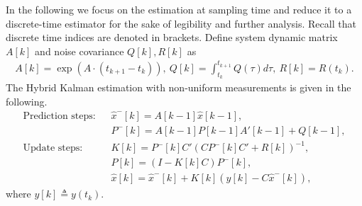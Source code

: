 \documentclass[12pt]{article}
\newcommand{\Rb}{{\mathbb{R}}}
\newcommand{\diag}{{\mathrm{diag}}}
\begin{document}
In the following we focus on the estimation at sampling time and reduce it to a discrete-time estimator for the sake of legibility and further analysis. Recall that discrete time indices are denoted in brackets.
Define system dynamic matrix $A[k]$ and noise covariance $Q[k],R[k]$ as  %
\begin{align*}
A[k]=\exp(A \cdot(t_{k+1}-t_{k}) ), \
Q[k]=\int_{t_k}^{t_{k+1}} Q(\tau)d\tau ,\
R[k]=R(t_k) .
\end{align*}
The Hybrid Kalman estimation with non-uniform measurements is given in the following. 
\begin{subequations}\label{eq:asy_kalman}
	\begin{align}
	\text{Prediction steps: } \hspace{5pt}
	&\hat{x}^-[k]=A[k-1]\hat{x}[k-1] ,\\
	&P^-[k]=A[k-1]P[k-1]A{'}[k-1] + Q[k-1], \\
	\text{Update steps: } \hspace{5pt}
	&K[k]=P^-[k] C{'} \left(C P^-[k] C{'}+R[k] \right)^{-1}  , \label{eq:def_Kk_asy} 	\\
	& P[k] = (I-K[k]C) P^-[k], \label{eq:def_Pt_asy} \\
	& \hat{x}[k]=\hat{x}^-[k] + K[k]  \left(y[k]-C\hat{x}^-[k] \right) , \label{eq:def_xt_asy}
	\end{align}
\end{subequations}
where $y[k]\triangleq y(t_k)$.
\end{document}
